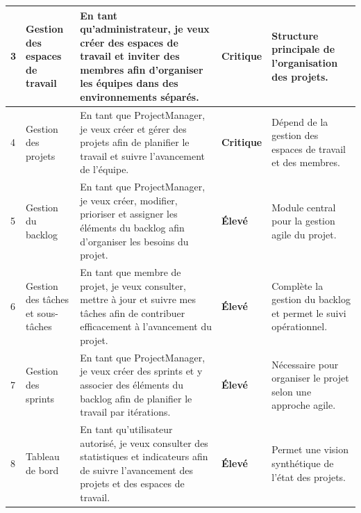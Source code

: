 \begin{longtable}{|p{0.8cm}|p{3.7cm}|p{5.3cm}|p{1.8cm}|p{3.8cm}|}
  3           & Gestion des espaces de travail            & En tant qu'administrateur, je veux créer des espaces de travail et inviter des membres afin d'organiser les équipes dans des environnements séparés.         & \cellcolor{niveauCritique}\textbf{Critique} & Structure principale de l'organisation des projets.                                        \\
  \hline

  4           & Gestion des projets                       & En tant que ProjectManager, je veux créer et gérer des projets afin de planifier le travail et suivre l'avancement de l'équipe.                              & \cellcolor{niveauCritique}\textbf{Critique} & Dépend de la gestion des espaces de travail et des membres.                                \\
  \hline

  5           & Gestion du backlog                        & En tant que ProjectManager, je veux créer, modifier, prioriser et assigner les éléments du backlog afin d'organiser les besoins du projet.                   & \cellcolor{niveauEleve}\textbf{Élevé}       & Module central pour la gestion agile du projet.                                            \\
  \hline

  6           & Gestion des tâches et sous-tâches         & En tant que membre de projet, je veux consulter, mettre à jour et suivre mes tâches afin de contribuer efficacement à l'avancement du projet.                & \cellcolor{niveauEleve}\textbf{Élevé}       & Complète la gestion du backlog et permet le suivi opérationnel.                            \\
  \hline

  7           & Gestion des sprints                       & En tant que ProjectManager, je veux créer des sprints et y associer des éléments du backlog afin de planifier le travail par itérations.                     & \cellcolor{niveauEleve}\textbf{Élevé}       & Nécessaire pour organiser le projet selon une approche agile.                              \\
  \hline

  8           & Tableau de bord                           & En tant qu'utilisateur autorisé, je veux consulter des statistiques et indicateurs afin de suivre l'avancement des projets et des espaces de travail.        & \cellcolor{niveauEleve}\textbf{Élevé}       & Permet une vision synthétique de l'état des projets.                                       \\
  \hline


\end{longtable}
